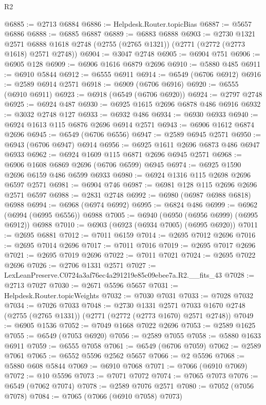 \begin{lexlean}{R2}
\begin{coremodule}
@6885 := @2713 @6884
@6886 := Helpdesk.Router.topicBias
@6887 := @5657 @6886
@6888 := @6885 @6887
@6889 := @6883 @6888
@6903 := @2730
    @1321
    @2571
    @6888
    @1618
    @2748
    (@2755 (@2765 @1321))
    (@2771 (@2772 (@2773 @1618) @2571 @2748))
@6904 := @3047 @2748
@6905 := @6904 @751
@6906 := @6905 @128
@6909 := @6906 @1616 @6879 @2696
@6910 := @5880 @485
@6911 := @6910 @5844
@6912 := @6555 @6911
@6914 := @6549 (@6706 @6912)
@6916 := @2589 @6914 @2571
@6918 := @6909 (@6706 @6916)
@6920 := @6555 (@6910 @6911)
@6923 := @6918 (@6549 (@6706 @6920))
@6924 := @2797 @2748
@6925 := @6924 @487
@6930 := @6925 @1615 @2696 @6878 @486 @6916
@6932 := @3032 @2748 @127
@6933 := @6932 @486
@6934 := @6930 @6933
@6940 := @6924 @1613 @115 @6876 @2696 @6914 @2571
@6943 := @6906 @1612 @6874 @2696
@6945 := @6549 (@6706 @6556)
@6947 := @2589 @6945 @2571
@6950 := @6943 (@6706 @6947) @6914
@6956 := @6925 @1611 @2696 @6873 @486 @6947 @6933
@6962 := @6924 @1609 @115 @6871 @2696 @6945 @2571
@6968 := @6906 @1608 @6869 @2696 (@6706 @6599) @6945
@6974 := @6925 @1590 @2696 @6159 @486 @6599 @6933
@6980 := @6924 @1316 @115 @2698 @2696 @6597 @2571
@6981 := @6904 @746
@6987 := @6981 @128 @115 @2696 @2696 @2571 @6597
@6988 := @2831 @2748
@6992 := @6980 (@6987 @6988 @6818) @6988
@6994 := @6968 (@6974 @6992)
@6995 := @6824 @486
@6999 := @6962 (@6994 (@6995 @6556)) @6988
@7005 := @6940 (@6950 (@6956 @6999) (@6995 @6912)) @6988
@7010 := @6903 (@6923 (@6934 @7005) (@6995 @6920))
@7011 := @2695 @6881
@7012 := @7011 @6159
@7014 := @2695 @7012 @2696
@7016 := @2695 @7014 @2696
@7017 := @7011 @7016
@7019 := @2695 @7017 @2696
@7021 := @2695 @7019 @2696
@7022 := @7011 @7021
@7024 := @2695 @7022 @2696
@7026 := @2706 @1331 @2571
@7027 := LexLeanPreserve.C0724a3af76ec4a291219e85c09ebee7a.R2.__fits_43
@7028 := @2713 @7027
@7030 := @2671 @5596 @5657
@7031 := Helpdesk.Router.topicWeights
@7032 := @7030 @7031
@7033 := @7028 @7032
@7034 := @7026 @7033
@7048 := @2730
    @1331
    @2571
    @7033
    @1670
    @2748
    (@2755 (@2765 @1331))
    (@2771 (@2772 (@2773 @1670) @2571 @2748))
@7049 := @6905 @1536
@7052 := @7049 @1668 @7022 @2696
@7053 := @2589 @1625
@7055 := @6549 (@7053 @6920)
@7056 := @2589 @7055
@7058 := @5880 @1633 @6911
@7059 := @6555 @7058
@7061 := @6549 (@6706 @7059)
@7062 := @2589 @7061
@7065 := @6552 @5596 @2562 @5657
@7066 := @2 @5596
@7068 := @5880 @608 @5844
@7069 := @6910 @7068
@7071 := @7066 (@6910 @7069)
@7072 := @10 @5596
@7073 := @7071 @7072
@7074 := @7065 @7073
@7076 := @6549 (@7062 @7074)
@7078 := @2589 @7076 @2571
@7080 := @7052 (@7056 @7078)
@7084 := @7065 (@7066 (@6910 @7058) @7073)

\end{coremodule}
\end{lexlean}

